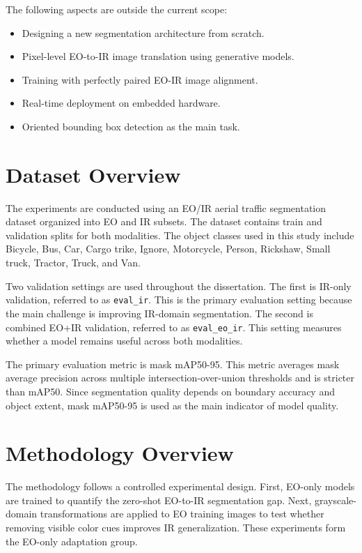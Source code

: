 The following aspects are outside the current scope:

\begin{itemize}
    \item Designing a new segmentation architecture from scratch.
    \item Pixel-level EO-to-IR image translation using generative models.
    \item Training with perfectly paired EO-IR image alignment.
    \item Real-time deployment on embedded hardware.
    \item Oriented bounding box detection as the main task.
\end{itemize}

\section{Dataset Overview}

The experiments are conducted using an EO/IR aerial traffic segmentation dataset organized into EO and IR subsets. The dataset contains train and validation splits for both modalities. The object classes used in this study include Bicycle, Bus, Car, Cargo trike, Ignore, Motorcycle, Person, Rickshaw, Small truck, Tractor, Truck, and Van.

Two validation settings are used throughout the dissertation. The first is IR-only validation, referred to as \texttt{eval\_ir}. This is the primary evaluation setting because the main challenge is improving IR-domain segmentation. The second is combined EO+IR validation, referred to as \texttt{eval\_eo\_ir}. This setting measures whether a model remains useful across both modalities.

The primary evaluation metric is mask mAP50-95. This metric averages mask average precision across multiple intersection-over-union thresholds and is stricter than mAP50. Since segmentation quality depends on boundary accuracy and object extent, mask mAP50-95 is used as the main indicator of model quality.

\section{Methodology Overview}

The methodology follows a controlled experimental design. First, EO-only models are trained to quantify the zero-shot EO-to-IR segmentation gap. Next, grayscale-domain transformations are applied to EO training images to test whether removing visible color cues improves IR generalization. These experiments form the EO-only adaptation group.

